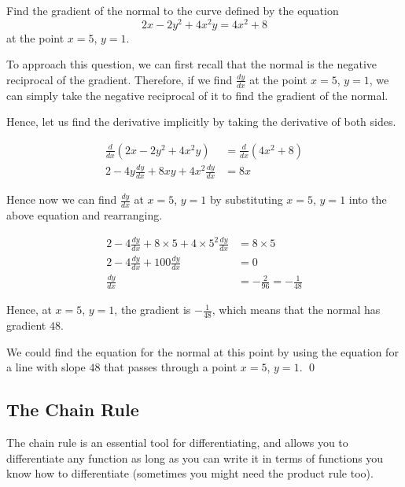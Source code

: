 \begin{example}
    Find the gradient of the normal to the curve defined by the equation 
    \[ 2x - 2y^2 + 4x^2y = 4x^2 + 8\]
    at the point $x = 5$, $y = 1$.
\end{example}
\begin{solution}
    To approach this question, we can first recall that the normal is the negative reciprocal of the gradient. Therefore, if we find $\frac{dy }{dx}$ at the point 
    $x = 5$, $y = 1$, we can simply take the negative reciprocal of it to find the gradient of the normal.

    Hence, let us find the derivative implicitly by taking the derivative of both sides.

    \begin{align*}
        \frac{d}{dx}(2x - 2y^2 + 4x^2y) &= \frac{d}{dx}(4x^2 + 8) \\
         2 - 4y \frac{dy }{dx} + 8xy + 4x^2 \frac{dy }{dx} &= 8x \tag{using the chain and product rule}
    \end{align*}

    Hence now we can find $\frac{dy }{dx}$ at $x = 5$, $y = 1$ by substituting $x = 5$, $y = 1$ into the above equation and rearranging.

    \begin{align*}
         2 - 4 \frac{dy }{dx} + 8\times 5 + 4 \times 5^2 \frac{dy }{dx} &= 8\times 5 \tag{substituting $x = 5$, $y = 1$}\\ 
         2 - 4\frac{dy }{dx}  + 100\frac{dy }{dx}  &= 0 \tag{simplifying}\\
         \frac{dy }{dx} &= -\frac{2}{96} = - \frac{1}{48} \tag{rearranging}
    \end{align*}

    Hence, at $x = 5$, $y = 1$, the gradient is $- \frac{1}{48}$, which means that the normal has gradient $48$.

    We could find the equation for the normal at this point by using the equation for a line with slope $48$ that passes through a point $x = 5$, $y = 1$.
    \qed
\end{solution}


\subsection{The Chain Rule} \label{sec:chain-rule}
The chain rule is an essential tool for differentiating, and allows you to differentiate any function as long as you can write it in terms of functions you know how to differentiate (sometimes you might need the product rule too).

